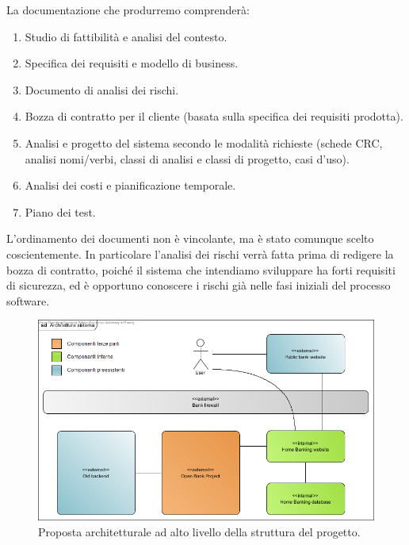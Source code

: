 \documentclass[10pt]{softeng} %
\begin{document}
La documentazione che produrremo comprender\`a:
\begin{enumerate}
	\item Studio di fattibilit\`a e analisi del contesto.
	\item Specifica dei requisiti e modello di business.
	\item Documento di analisi dei rischi.
	\item Bozza di contratto per il cliente (basata sulla specifica dei requisiti prodotta).
	\item Analisi e progetto del sistema secondo le modalit\`a richieste (schede CRC, analisi nomi/verbi, classi di analisi e classi di progetto, casi d'uso).
	\item Analisi dei costi e pianificazione temporale.
	\item Piano dei test.
\end{enumerate}
L'ordinamento dei documenti non \`e vincolante, ma \`e stato comunque scelto coscientemente.
In particolare l'analisi dei rischi verr\`a fatta prima di redigere la bozza di contratto, poich\'e il sistema che intendiamo sviluppare ha forti requisiti di sicurezza, ed \`e opportuno conoscere i rischi gi\`a nelle fasi iniziali del processo software.


\printcustombib{} 


\graphicspath{{Images/}}
\begin{figure}[hbt]
	\centering
	\includegraphics[width=\textwidth]{architettura_sistema}
	\caption{Proposta architetturale ad alto livello della struttura del progetto.}
	\label{fig:project_structure}
\end{figure}
\end{document}
